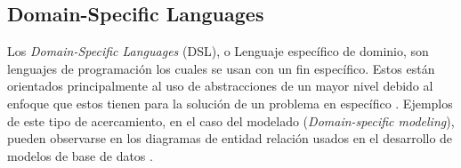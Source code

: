 \documentclass[12pt]{article}
\begin{document}
\subsection{Domain-Specific Languages} %



Los \textit{Domain-Specific Languages} (DSL), o Lenguaje específico de dominio, son lenguajes de programación los cuales se usan con un fin específico. Estos están orientados principalmente al uso de abstracciones de un mayor nivel debido al enfoque que estos tienen para la solución de un problema en específico \cite{Kelly2008}. Ejemplos de este tipo de acercamiento, en el caso del modelado (\textit{Domain-specific modeling}), pueden observarse en los diagramas de entidad relación usados en el desarrollo de modelos de base de datos \cite{Celikovic2014ADF}.







\end{document}
